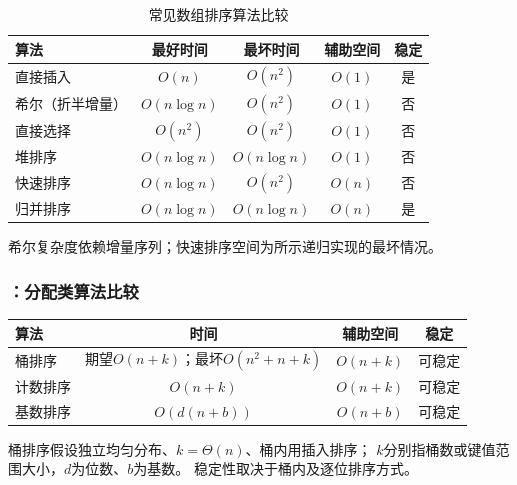 


\begin{frame}
    \frametitle{\insertsectionhead}
    \begin{table}
        \centering
        \small
        \caption{常见数组排序算法比较}
        \begin{tabular}{lcccc}
            \toprule
            算法 & 最好时间 & 最坏时间 & 辅助空间 & 稳定 \\
            \midrule
            直接插入 & $O(n)$ & $O(n^2)$ & $O(1)$ & 是 \\
            希尔（折半增量） & $O(n\log n)$ & $O(n^2)$ & $O(1)$ & 否 \\
            直接选择 & $O(n^2)$ & $O(n^2)$ & $O(1)$ & 否 \\
            堆排序 & $O(n\log n)$ & $O(n\log n)$ & $O(1)$ & 否 \\
            快速排序 & $O(n\log n)$ & $O(n^2)$ & $O(n)$ & 否 \\
            归并排序 & $O(n\log n)$ & $O(n\log n)$ & $O(n)$ & 是 \\
            \bottomrule
        \end{tabular}
    \end{table}
    \small 希尔复杂度依赖增量序列；快速排序空间为所示递归实现的最坏情况。
\end{frame}

\begin{frame}
    \frametitle{\insertsectionhead：分配类算法比较}
    \begin{table}
        \centering
        \small
        \begin{tabular}{lccc}
            \toprule
            算法 & 时间 & 辅助空间 & 稳定 \\
            \midrule
            桶排序 & 期望$O(n+k)$；最坏$O(n^2+n+k)$ & $O(n+k)$ & 可稳定 \\
            计数排序 & $O(n+k)$ & $O(n+k)$ & 可稳定 \\
            基数排序 & $O(d(n+b))$ & $O(n+b)$ & 可稳定 \\
            \bottomrule
        \end{tabular}
    \end{table}
    \small 桶排序假设独立均匀分布、$k=\Theta(n)$、桶内用插入排序；
    $k$分别指桶数或键值范围大小，$d$为位数、$b$为基数。
    稳定性取决于桶内及逐位排序方式。
\end{frame}

